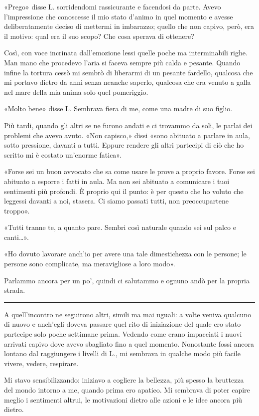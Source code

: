 «Prego» disse L. sorridendomi rassicurante e facendosi da parte. Avevo l'impressione che conoscesse
il mio stato d'animo in quel momento e avesse deliberatamente deciso di mettermi in imbarazzo;
quello che non capivo, però, era il motivo: qual era il suo scopo? Che cosa sperava di ottenere?

Così, con voce incrinata dall'emozione lessi quelle poche ma interminabili righe. Man mano che
procedevo l'aria si faceva sempre più calda e pesante. Quando infine la tortura cessò mi sembrò di
liberarmi di un pesante fardello, qualcosa che mi portavo dietro da anni senza neanche saperlo,
qualcosa che era venuto a galla nel mare della mia anima solo quel pomeriggio.

«Molto bene» disse L. Sembrava fiera di me, come una madre di suo figlio.

Più tardi, quando gli altri se ne furono andati e ci trovammo da soli, le parlai dei problemi che
avevo avuto. «Non capisco,» dissi «sono abituato a parlare in aula, sotto pressione, davanti a
tutti. Eppure rendere gli altri partecipi di ciò che ho scritto mi è costato un'enorme fatica».

«Forse sei un buon avvocato che sa come usare le prove a proprio favore. Forse sei abituato a
esporre i fatti in aula. Ma non sei abituato a comunicare i tuoi sentimenti più profondi. È proprio
qui il punto: è per questo che ho voluto che leggessi davanti a noi, stasera. Ci siamo passati
tutti, non preoccupartene troppo».

«Tutti tranne te, a quanto pare. Sembri così naturale quando sei sul palco e canti\dots{}».

«Ho dovuto lavorare anch'io per avere una tale dimestichezza con le persone; le persone sono
complicate, ma meravigliose a loro modo».

Parlammo ancora per un po', quindi ci salutammo e ognuno andò per la propria strada.

\plainbreak{1}

A quell'incontro ne seguirono altri, simili ma mai uguali: a volte veniva qualcuno di nuovo e
anch'egli doveva passare quel rito di iniziazione del quale ero stato partecipe solo poche settimane
prima. Vedendo come erano impacciati i nuovi arrivati capivo dove avevo sbagliato fino a quel
momento. Nonostante fossi ancora lontano dal raggiungere i livelli di L., mi sembrava in qualche
modo più facile vivere, vedere, respirare.

Mi stavo sensibilizzando: iniziavo a cogliere la bellezza, più spesso la bruttezza del mondo intorno
a me, quando prima ero apatico. Mi sembrava di poter capire meglio i sentimenti altrui, le
motivazioni dietro alle azioni e le idee ancora più dietro.

